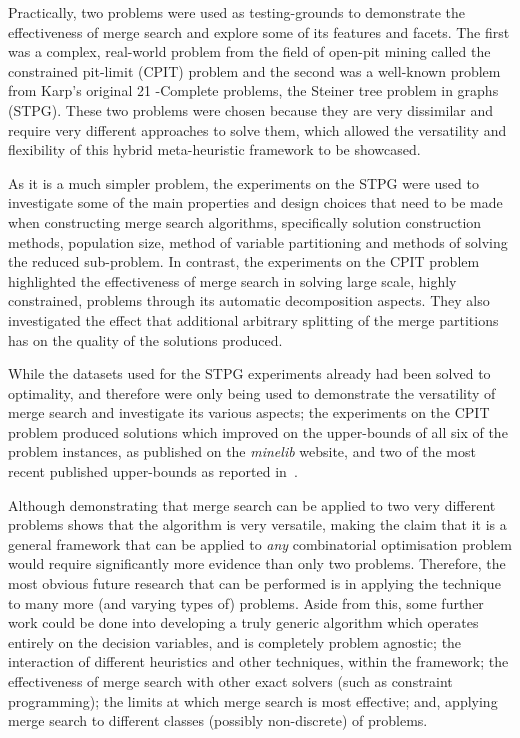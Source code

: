 \documentclass[journal]{IEEEtran}
\begin{document}
Practically, two problems were used as testing-grounds to demonstrate the effectiveness of merge search and explore some of its features and facets. The first was a complex, real-world problem from the field of open-pit mining called the constrained pit-limit (CPIT) problem and the second was a well-known problem from Karp's original 21 \NP-Complete problems, the Steiner tree problem in graphs (STPG). These two problems were chosen because they are very dissimilar and require very different approaches to solve them, which allowed the versatility and flexibility of this hybrid meta-heuristic framework to be showcased.

As it is a much simpler problem, the experiments on the STPG were used to investigate some of the main properties and design choices that need to be made when constructing merge search algorithms, specifically solution construction methods, population size, method of variable partitioning and methods of solving the reduced sub-problem. In contrast, the experiments on the CPIT problem highlighted the effectiveness of merge search in solving large scale, highly constrained, problems through its automatic decomposition aspects. They also investigated the effect that additional arbitrary splitting of the merge partitions has on the quality of the solutions produced.

While the datasets used for the STPG experiments already had been solved to optimality, and therefore were only being used to demonstrate the versatility of merge search and investigate its various aspects; the experiments on the CPIT problem produced solutions which improved on the upper-bounds of all six of the problem instances, as published on the \emph{minelib} website, and two of the most recent published upper-bounds as reported in~\cite{minelib-improved}.

\smallskip

Although demonstrating that merge search can be applied to two very different problems shows that the algorithm is very versatile, making the claim that it is a general framework that can be applied to \emph{any} combinatorial optimisation problem would require significantly more evidence than only two problems. Therefore, the most obvious future research that can be performed is in applying the technique to many more (and varying types of) problems. Aside from this, some further work could be done into developing a truly generic algorithm which operates entirely on the decision variables, and is completely problem agnostic; the interaction of different heuristics and other techniques, within the framework; the effectiveness of merge search with other exact solvers (such as constraint programming); the limits at which merge search is most effective; and, applying merge search to different classes (possibly non-discrete) of problems.
\end{document}
